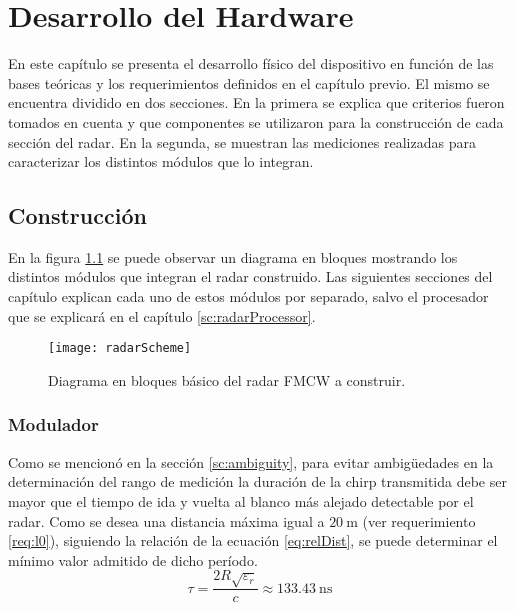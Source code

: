 \chapter{Desarrollo del Hardware} \label{ch:development}

\ifpdf
    \graphicspath{{Chapter3/Figs/Raster/}{Chapter3/Figs/PDF/}{Chapter3/Figs/}}
\else
    \graphicspath{{Chapter3/Figs/Vector/}{Chapter3/Figs/}}
\fi

En este capítulo se presenta el desarrollo físico del dispositivo en función de las bases teóricas y los requerimientos definidos en el capítulo previo. El mismo se encuentra dividido en dos secciones. En la primera se explica que criterios fueron tomados en cuenta y que componentes se utilizaron para la construcción de cada sección del radar. En la segunda, se muestran las mediciones realizadas para caracterizar los distintos módulos que lo integran.


\section{Construcción}

En la figura \ref{fig:radarDiagram} se puede observar un diagrama en bloques mostrando los distintos módulos que integran el radar construido. Las siguientes secciones del capítulo explican cada uno de estos módulos por separado, salvo el procesador que se explicará en el capítulo \ref{sc:radarProcessor}.
\begin{figure}
 \centering
 \texttt{[image: radarScheme]}
 \caption{Diagrama en bloques básico del radar FMCW a construir.}
 \label{fig:radarDiagram}
\end{figure}


\subsection{Modulador}

Como se mencionó en la sección \ref{sc:ambiguity}, para evitar ambigüedades en la determinación del rango de medición la duración de la chirp transmitida debe ser mayor que el tiempo de ida y vuelta al blanco más alejado detectable por el radar. Como se desea una distancia máxima igual a $\SI{20}{\meter}$ (ver requerimiento \ref{req:l0}), siguiendo la relación de la ecuación \ref{eq:relDist}, se puede determinar el mínimo valor admitido de dicho período.
\begin{equation}
  \tau = \dfrac{2R\sqrt{\varepsilon_r}}{c} \approx \SI{133.43}{\nano\second}
\end{equation}

